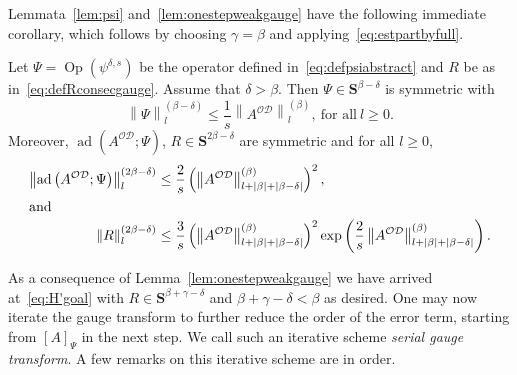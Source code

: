 \documentclass[AHL,Unicode,longabstracts,published]{cedram}
\DeclareMathOperator{\ad}{ad}
\DeclareMathOperator{\Op}{Op}
\newcommand{\CD}{\mathcal{D}}
\newcommand{\CO}{\mathcal{O}}
\newcommand{\COD}{{\CO\CD}}
\newcommand{\BS}{\mathbf S}
\newcommand{\resc}{s}
\newcommand{\abs}[1]{\left\lvert #1 \right\rvert}
\newcommand{\snorm}[3]{\left\| #1\right\|_{#3}^{(#2)}}
\begin{document}
Lemmata~\ref{lem:psi} and~\ref{lem:onestepweakgauge} have the following immediate corollary, which follows by choosing $\gamma=\beta$ and applying~\eqref{eq:estpartbyfull}.
\begin{coro}\label{cor:onestepweakgauge}
Let $\Psi=\Op(\psi^{\delta, s})$ be the operator defined in~\eqref{eq:defpsiabstract} and $R$ be as in~\eqref{eq:defRconsecgauge}. Assume that $\delta>\beta$. Then $\Psi \in \BS^{\beta-\delta}$ is symmetric with
\begin{equation}\label{eq:estimatepsinormcor}
\snorm{\Psi}{\beta - \delta}{l} \le \frac 1 \resc \snorm{A^\COD}{\beta}{l}, \ \text{for all}\ l\geq 0.
\end{equation}
Moreover, $\ad(A^\COD;\Psi)$, $R\in \BS^{2\beta- \delta}$ are symmetric and for all $l\geq 0$,
\begin{align}
\snorm{\ad\left(A^\COD;\Psi\right)}{2\beta-\delta}{l}&\le \frac{2}{\resc} \left(\snorm{A^\COD}{\beta}{l + \abs\beta + \abs{\beta - \delta}}\right)^2,
\\
\intertext{and}
\snorm{R}{2\beta-\delta}l &\le \frac{3}{\resc} \left(\snorm{A^\COD}{\beta}{l + \abs\beta + \abs{\beta - \delta}}\right)^2 \exp\left(\frac 2 \resc \snorm{A^\COD}{\beta}{l + \abs\beta+\abs{\beta - \delta}}\right).\label{eq:Rnormboundsweakcor}
\end{align}
\end{coro}
As a consequence of Lemma~\ref{lem:onestepweakgauge} we have arrived at~\eqref{eq:H'goal} with $R\in\BS^{\beta+\gamma-\delta}$ and $\beta+\gamma-\delta<\beta$ as desired. One may now iterate the gauge transform to further reduce the order of the error term, starting from $[A]_\Psi$ in the next step. We call such an iterative scheme
\emph{serial gauge transform}. A few remarks on this iterative scheme are in order.
\end{document}

